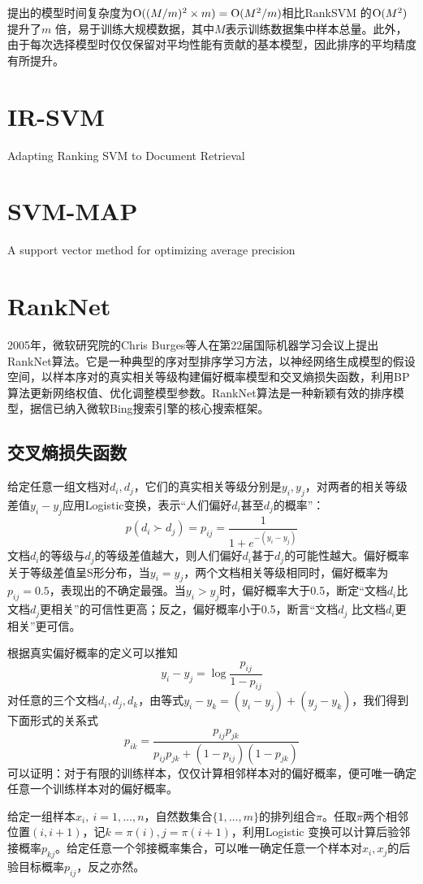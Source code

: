 \cite{jung2011ensemble}提出的模型时间复杂度为$\operatorname{\mathrm{O}}((M/m)^2 \times m) = \operatorname{\mathrm{O}}(M^2/m)$相比RankSVM 的$\operatorname{\mathrm{O}}(M^2)$ 提升了$m$ 倍，易于训练大规模数据，其中$M$表示训练数据集中样本总量。此外，由于每次选择模型时仅仅保留对平均性能有贡献的基本模型，因此排序的平均精度有所提升。

\section{IR-SVM}
\cite{cao2006adapting}Adapting Ranking SVM to Document Retrieval

\section{SVM-MAP}
\cite{yue2007support}A support vector method for optimizing average precision

\section{RankNet}
2005年，微软研究院的Chris Burges等人\cite{burges2005learning}在第22届国际机器学习会议上提出RankNet算法。它是一种典型的序对型排序学习方法，以神经网络生成模型的假设空间，以样本序对的真实相关等级构建偏好概率模型和交叉熵损失函数，利用BP算法更新网络权值、优化调整模型参数。RankNet算法是一种新颖有效的排序模型，据信已纳入微软Bing搜索引擎的核心搜索框架。

\subsection{交叉熵损失函数}
给定任意一组文档对$d_i,d_j$，它们的真实相关等级分别是$y_i,y_j$，对两者的相关等级差值$y_i-y_j$应用Logistic变换，表示“人们偏好$d_i$甚至$d_j$的概率”：
\begin{equation}
    p(d_i\succ d_j) = p_{ij} = \frac{1}{1+e^{-(y_i-y_j)}}
\end{equation}
文档$d_i$的等级与$d_j$的等级差值越大，则人们偏好$d_i$甚于$d_j$的可能性越大。偏好概率关于等级差值呈S形分布，当$y_i=y_j$，两个文档相关等级相同时，偏好概率为$p_{ij}=0.5$，表现出的不确定最强。当$y_i>y_j$时，偏好概率大于0.5，断定“文档$d_i$比文档$d_j$更相关”的可信性更高；反之，偏好概率小于0.5，断言“文档$d_j$ 比文档$d_i$更相关”更可信。

根据真实偏好概率的定义可以推知
\begin{equation}
    y_i-y_j=\log \frac{p_{ij}}{1-p_{ij}}
\end{equation}
对任意的三个文档$d_i,d_j,d_k$，由等式$y_i-y_k=(y_i-y_j) + (y_j - y_k)$，我们得到下面形式的关系式
\begin{equation}
    p_{ik} = \frac{p_{ij}p_{jk}}{p_{ij}p_{jk} + (1-p_{ij})(1-p_{jk})}
\end{equation}
可以证明：对于有限的训练样本，仅仅计算相邻样本对的偏好概率，便可唯一确定任意一个训练样本对的偏好概率。
\begin{theorem}
给定一组样本$x_i,~i=1,\ldots,n$，自然数集合$\{1,\ldots,m\}$的排列组合$\pi$。任取$\pi$两个相邻位置$(i,i+1)$，记$k=\pi(i),j=\pi(i+1)$，利用Logistic 变换可以计算后验邻接概率$p_{kj}$。给定任意一个邻接概率集合，可以唯一确定任意一个样本对$x_i,x_j$的后验目标概率$p_{ij}$，反之亦然。
\end{theorem}

